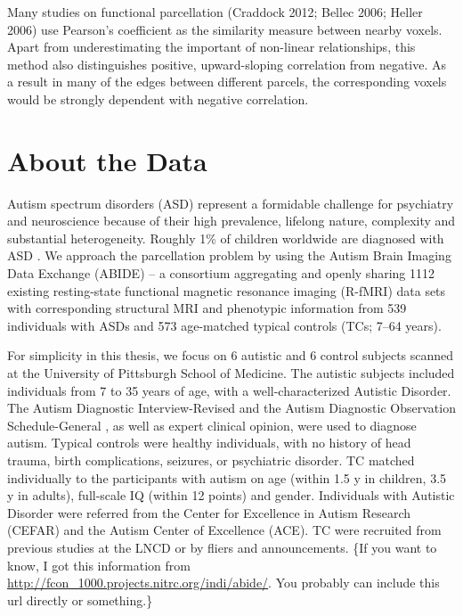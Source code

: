 Many studies on functional parcellation (Craddock 2012; Bellec 2006;
Heller 2006) use Pearson's coefficient as the similarity measure between
nearby voxels. Apart from underestimating the important of non-linear
relationships, this method also distinguishes positive, upward-sloping
correlation from negative. As a result in many of the edges between
different parcels, the corresponding voxels would be strongly dependent
with negative correlation.

\section{About the Data}
{\color{blue}

Autism spectrum disorders (ASD) represent a formidable challenge for
psychiatry and neuroscience because of their high prevalence, lifelong
nature, complexity and substantial heterogeneity. Roughly 1\% of
children worldwide are diagnosed with ASD \cite{centers2010autism}.
We approach the parcellation problem by using the Autism Brain Imaging
Data Exchange (ABIDE) -- a consortium aggregating and openly sharing
1112 existing resting-state functional magnetic resonance imaging
(R-fMRI) data sets with corresponding structural MRI and phenotypic
information from 539 individuals with ASDs and 573 age-matched typical
controls (TCs; 7–64 years).

For simplicity in this thesis, we focus on 6 autistic and 6 control
subjects scanned at the University of Pittsburgh School of Medicine.
The autistic subjects included individuals from 7 to 35 years of age,
with a well-characterized Autistic Disorder. The Autism Diagnostic
Interview-Revised \cite{lord1994autism} and the Autism Diagnostic
Observation Schedule-General \cite{lord2000autism}, as well as expert
clinical opinion, were used to diagnose autism. Typical controls were
healthy individuals, with no history of head trauma, birth
complications, seizures, or psychiatric disorder. TC matched
individually to the participants with autism on age (within 1.5 y in
children, 3.5 y in adults), full-scale IQ (within 12 points) and gender.
Individuals with Autistic Disorder were referred from the Center for
Excellence in Autism Research (CEFAR) and the Autism Center of
Excellence (ACE). TC were recruited from previous studies at the LNCD or
by fliers and announcements.
\{If you want to know, I got this information from
\url{http://fcon_1000.projects.nitrc.org/indi/abide/}.
You probably can include this url directly or something.\}

}
